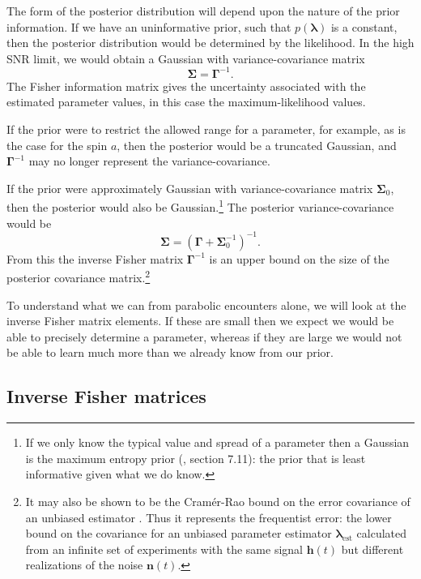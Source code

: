 \documentclass[useAMS,usedcolumn,usegraphicx,usenatbib]{mn2e}
\newcommand{\sub}[1]{\ensuremath{_\mathrm{#1}}}
\begin{document}
The form of the posterior distribution will depend upon the nature of the prior information. If we have an uninformative prior, such that $p(\boldsymbol{\lambda})$ is a constant, then the posterior distribution would be determined by the likelihood. In the high SNR limit, we would obtain a Gaussian with variance-covariance matrix
\begin{equation}
\boldsymbol{\Sigma} = \boldsymbol{\Gamma}^{-1}.
\end{equation}
The Fisher information matrix gives the uncertainty associated with the estimated parameter values, in this case the maximum-likelihood values.

If the prior were to restrict the allowed range for a parameter, for example, as is the case for the spin $a$, then the posterior would be a truncated Gaussian, and $\boldsymbol{\Gamma}^{-1}$ may no longer represent the variance-covariance.

If the prior were approximately Gaussian with variance-covariance matrix $\boldsymbol{\Sigma}_0$, then the posterior would also be Gaussian.\footnote{If we only know the typical value and spread of a parameter then a Gaussian is the maximum entropy prior (\citealt{Jaynes2003}, section 7.11): the prior that is least informative given what we do know.} The posterior variance-covariance would be \citep{Cutler1994, Vallisneri2008}
\begin{equation}
\boldsymbol{\Sigma} = \left(\boldsymbol{\Gamma} + \boldsymbol{\Sigma}_0^{-1}\right)^{-1}.
\label{eq:Posterior_variance}
\end{equation}
From this the inverse Fisher matrix $\boldsymbol{\Gamma}^{-1}$ is an upper bound on the size of the posterior covariance matrix.\footnote{It may also be shown to be the Cram\'{e}r-Rao bound on the error covariance of an unbiased estimator \citep{Cutler1994, Vallisneri2008}. Thus it represents the frequentist error: the lower bound on the covariance for an unbiased parameter estimator $\boldsymbol{\lambda}\sub{est}$ calculated from an infinite set of experiments with the same signal $\boldsymbol{h}(t)$ but different realizations of the noise $\boldsymbol{n}(t)$.}

To understand what we can from parabolic encounters alone, we will look at the inverse Fisher matrix elements. If these are small then we expect we would be able to precisely determine a parameter, whereas if they are large we would not be able to learn much more than we already know from our prior.

\subsection{Inverse Fisher matrices}
\end{document}
